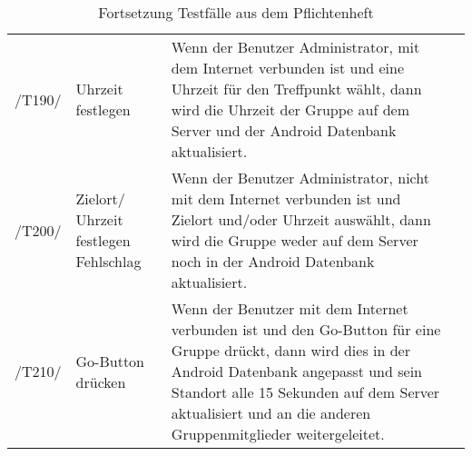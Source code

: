 \begin{table}[H]
{\begin{tabular}{|p{}||p{}|p{}|>{\centering}p{}|}
				\hspace{0pt}/T190/ & Uhrzeit festlegen & Wenn der Benutzer Administrator, mit dem Internet verbunden ist und eine Uhrzeit für den Treffpunkt wählt, dann wird die Uhrzeit der Gruppe auf dem Server und der Android Datenbank aktualisiert. & \checkmark\tabularnewline
				\hspace{0pt}/T200/ & Zielort/ Uhrzeit festlegen Fehlschlag & Wenn der Benutzer Administrator, nicht mit dem Internet verbunden ist und Zielort und/oder Uhrzeit auswählt, dann wird die Gruppe weder auf dem Server noch in der Android Datenbank aktualisiert. & \checkmark\tabularnewline
				\hspace{0pt}/T210/ & Go-Button drücken & Wenn der Benutzer mit dem Internet verbunden ist und den Go-Button für eine Gruppe drückt, dann wird dies in der Android Datenbank angepasst und sein Standort alle 15 Sekunden auf dem Server aktualisiert und an die anderen Gruppenmitglieder weitergeleitet.  & \checkmark\tabularnewline
				\hline
			\end{tabular}}
			\caption{Fortsetzung Testfälle aus dem Pflichtenheft}
	\end{table}
